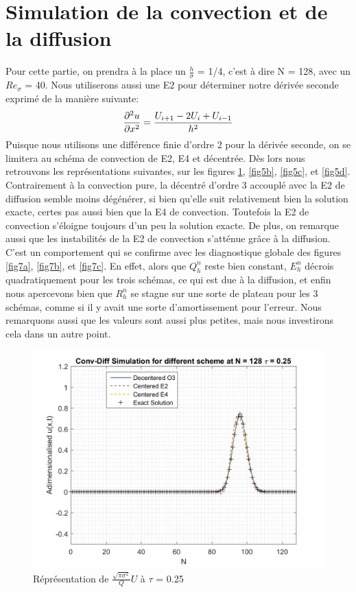 \documentclass{article}
\begin{document}
\section{Simulation de la convection et de la diffusion}
Pour cette partie, on prendra à la place un $\frac{h}{\sigma}$ = 1/4, c'est à dire N = 128, avec un $Re_\sigma$ = 40. Nous utiliserons aussi une E2 pour déterminer notre dérivée seconde exprimé de la manière suivante:\\
\begin{equation}
    \frac{\partial^2 u}{\partial x^2} = \frac{ U_{i+1}-2U_i+U_{i-1} }{h^2} \\
\end{equation}
Puisque nous utilisons une différence finie d'ordre 2 pour la dérivée seconde, on se limitera au schéma de convection de E2, E4 et décentrée. Dès lors nous retrouvons les représentations suivantes, sur les figures \ref{fig5a}, \ref{fig5b}, \ref{fig5c}, et \ref{fig5d}. Contrairement à la convection pure, la décentré d'ordre 3 accouplé avec la E2 de diffusion semble moins dégénérer, si bien qu'elle suit relativement bien la solution exacte, certes pas aussi bien que la E4 de convection. Toutefois la E2 de convection s'éloigne toujours d'un peu la solution exacte. De plus, on remarque aussi que les instabilités de la E2 de convection s'atténue grâce à la diffusion. C'est un comportement qui se confirme avec les diagnostique globale des figures \ref{fig7a}, \ref{fig7b}, et \ref{fig7c}. En effet, alors que $Q_h^n$ reste bien constant, $E_h^n$ décrois quadratiquement pour les trois schémas, ce qui est due à la diffusion, et enfin nous apercevons bien que $R_h^n$ se stagne sur une sorte de plateau pour les 3 schémas, comme si il y avait une sorte d'amortissement pour l'erreur. Nous remarquons aussi que les valeurs sont aussi plus petites, mais nous investirons cela dans un autre point.
\begin{figure}[H]
    \centering
    \includegraphics[scale=0.45]{img/fig5a.png}
    \caption{Réprésentation de $\frac{\sqrt{\pi \sigma^2}}{Q} U$ à $\tau$ = 0.25}
    \label{fig5a}
\end{figure}
\end{document}
